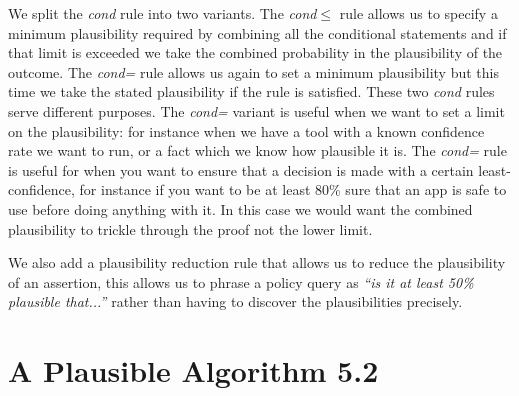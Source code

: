 We split the \emph{cond} rule into two variants. The \emph{cond$\leq$} rule
allows us to specify a minimum plausibility required by combining all the
conditional statements and if that limit is exceeded we take the combined
probability in the plausibility of the outcome. The \emph{cond=} rule allows us
again to set a minimum plausibility but this time we take the stated
plausibility if the rule is satisfied. These two \emph{cond} rules serve
different purposes. The \emph{cond=} variant is useful when we want to set a
limit on the plausibility: for instance when we have a tool with a known
confidence rate we want to run, or a fact which we know how plausible it is. The
\emph{cond=} rule is useful for when you want to ensure that a decision is made
with a certain least-confidence, for instance if you want to be at least 80\%
sure that an app is safe to use before doing anything with it. In this case we
would want the combined plausibility to trickle through the proof not the lower
limit.

We also add a plausibility reduction rule that allows us to reduce the
plausibility of an assertion, this allows us to phrase a policy query
as \emph{``is it at least 50\% plausible that...''} rather than having
to discover the plausibilities precisely.

\section{A Plausible Algorithm 5.2}

